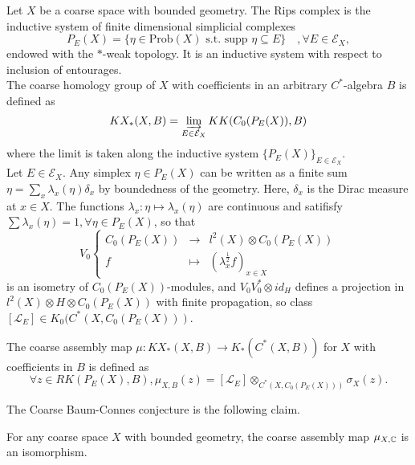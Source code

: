 Let $X$ be a coarse space with bounded geometry. The Rips complex is the inductive system of finite dimensional simplicial complexes
\[P_E(X)=\{\eta\in \text{Prob}(X)\text{ s.t. supp }\eta\subseteq E\}\quad,\forall E\in \mathcal E_X,\]
endowed with the $*$-weak topology. It is an inductive system with respect to inclusion of entourages.\\
 
The coarse homology group of $X$ with coefficients in an arbitrary $C^*$-algebra $B$ is defined as 
\[KX_*(X,B)=\varinjlim_{E\in \mathcal E_X} KK(C_0(P_E(X)),B)\]
where the limit is taken along the inductive system $\{P_E(X)\}_{E\in\mathcal E_X}$. \\

Let $E\in \mathcal E_X$. Any simplex $\eta\in P_E(X)$ can be written as a finite sum $\eta=\sum_x \lambda_x(\eta)\delta_x$ by boundedness of the geometry. Here, $\delta_x$ is the Dirac measure at $x\in X$. The functions $\lambda_x :\eta\mapsto \lambda_x(\eta)$ are continuous and satifisfy $\sum\lambda_x(\eta) = 1,\forall\eta\in P_E(X)$, so that
\[V_0\left\{\begin{array}{rcl} 
 C_0(P_E(X)) & \rightarrow 	& l^2(X)\otimes C_0(P_E(X)) 		\\ 
 f           & \mapsto 		& (\lambda_x^{\frac{1}{2}}f)_{x\in X} 
\end{array}\right.\] 
is an isometry of $C_0(P_E(X))$-modules, and $V_0V_0^*\otimes id_H$ defines a projection in $l^2(X)\otimes H\otimes C_0(P_E(X))$ with finite propagation, so class $[\mathcal L_E]\in K_0(C^*(X,C_0(P_E(X)))$.\\

\begin{definition}
The coarse assembly map $\mu:KX_*(X,B)\rightarrow K_*(C^*(X,B))$ for $X$ with coefficients in $B$ is defined as 
\[\forall z\in RK(P_E(X), B), \mu_{X,B}(z)=[\mathcal L_E]\otimes_{C^*(X,C_0(P_E(X)))} \sigma_X(z).\]
\end{definition}

The Coarse Baum-Connes conjecture is the following claim.\\

\begin{conj}
For any coarse space $X$ with bounded geometry, the coarse assembly map $\mu_{X,\mathbb C}$ is an isomorphism.\\
\end{conj}

